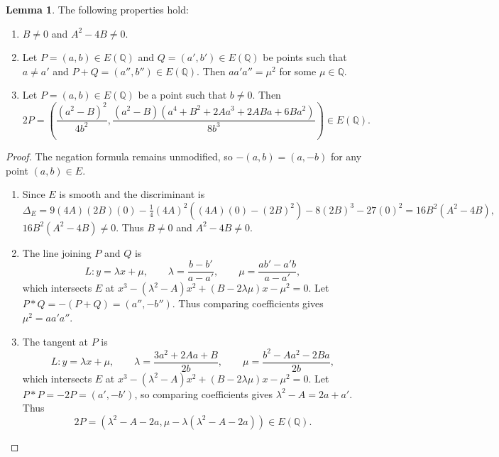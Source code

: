 \documentclass{article}
\newcommand{\Q}{\mathbb{Q}}
\newcommand{\rb}[1]{\left( #1 \right)}
\theoremstyle{definition}\newtheorem*{definition}{Definition}
\theoremstyle{definition}\newtheorem*{example}{Example}
\theoremstyle{definition}\newtheorem*{remark}{Remark}
\newtheorem{lemma}[proposition]{Lemma}
\begin{document}
\begin{lemma}
The following properties hold:
\begin{enumerate}
\item $ B \ne 0 $ and $ A^2 - 4B \ne 0 $.
\item Let $ P = \rb{a, b} \in E\rb{\Q} $ and $ Q = \rb{a', b'} \in E\rb{\Q} $ be points such that $ a \ne a' $ and $ P + Q = \rb{a'', b''} \in E\rb{\Q} $. Then $ aa'a'' = \mu^2 $ for some $ \mu \in \Q $.
\item Let $ P = \rb{a, b} \in E\rb{\Q} $ be a point such that $ b \ne 0 $. Then
$$ 2P = \rb{\dfrac{\rb{a^2 - B}^2}{4b^2}, \dfrac{\rb{a^2 - B}\rb{a^4 + B^2 + 2Aa^3 + 2ABa + 6Ba^2}}{8b^3}} \in E\rb{\Q}. $$
\end{enumerate}
\end{lemma}

\begin{proof}
The negation formula remains unmodified, so $ -\rb{a, b} = \rb{a, -b} $ for any point $ \rb{a, b} \in E $.
\begin{enumerate}
\item Since $ E $ is smooth and the discriminant is
$$ \Delta_E = 9\rb{4A}\rb{2B}\rb{0} - \tfrac{1}{4}\rb{4A}^2\rb{\rb{4A}\rb{0} - \rb{2B}^2} - 8\rb{2B}^3 - 27\rb{0}^2 = 16B^2\rb{A^2 - 4B}, $$
$ 16B^2\rb{A^2 - 4B} \ne 0 $. Thus $ B \ne 0 $ and $ A^2 - 4B \ne 0 $.
\item The line joining $ P $ and $ Q $ is
$$ L : y = \lambda x + \mu, \qquad \lambda = \dfrac{b - b'}{a - a'}, \qquad \mu = \dfrac{ab' - a'b}{a - a'}, $$
which intersects $ E $ at $ x^3 - \rb{\lambda^2 - A}x^2 + \rb{B - 2\lambda\mu}x - \mu^2 = 0 $. Let $ P * Q = -\rb{P + Q} = \rb{a'', -b''} $. Thus comparing coefficients gives $ \mu^2 = aa'a'' $.
\item The tangent at $ P $ is
$$ L : y = \lambda x + \mu, \qquad \lambda = \dfrac{3a^2 + 2Aa + B}{2b}, \qquad \mu = \dfrac{b^2 - Aa^2 - 2Ba}{2b}, $$
which intersects $ E $ at $ x^3 - \rb{\lambda^2 - A}x^2 + \rb{B - 2\lambda\mu}x - \mu^2 = 0 $. Let $ P * P = -2P = \rb{a', -b'} $, so comparing coefficients gives $ \lambda^2 - A = 2a + a' $. Thus
$$ 2P = \rb{\lambda^2 - A - 2a, \mu - \lambda\rb{\lambda^2 - A - 2a}} \in E\rb{\Q}. $$
\end{enumerate}
\end{proof}
\end{document}
